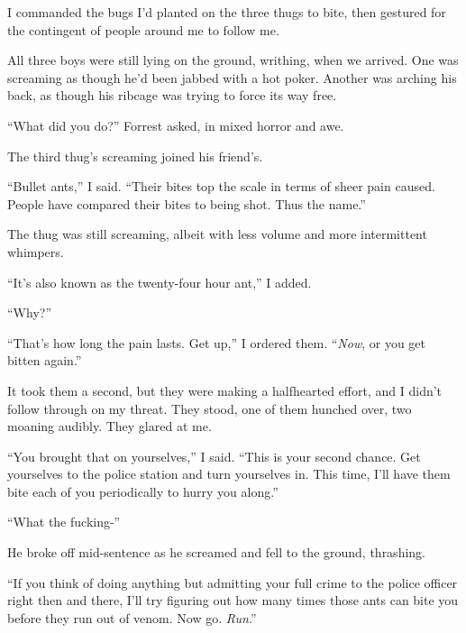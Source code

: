 I commanded the bugs I'd planted on the three thugs to bite, then gestured for the contingent of people around me to follow me.



All three boys were still lying on the ground, writhing, when we arrived.  One was screaming as though he'd been jabbed with a hot poker.  Another was arching his back, as though his ribcage was trying to force its way free.



``What did you do?''  Forrest asked, in mixed horror and awe.



The third thug's screaming joined his friend's.



``Bullet ants,'' I said.  ``Their bites top the scale in terms of sheer pain caused.  People have compared their bites to being shot.  Thus the name.''



The thug was still screaming, albeit with less volume and more intermittent whimpers.



``It's also known as the twenty-four hour ant,'' I added.



``Why?''



``That's how long the pain lasts.  Get up,'' I ordered them.  ``\emph{Now}, or you get bitten again.''



It took them a second, but they were making a halfhearted effort, and I didn't follow through on my threat.  They stood, one of them hunched over, two moaning audibly.  They glared at me.



``You brought that on yourselves,'' I said.  ``This is your second chance.  Get yourselves to the police station and turn yourselves in.  This time, I'll have them bite each of you periodically to hurry you along.''



``What the fucking-''



He broke off mid-sentence as he screamed and fell to the ground, thrashing.



``If you think of doing anything but admitting your full crime to the police officer right then and there, I'll try figuring out how many times those ants can bite you before they run out of venom.  Now go.  \emph{Run}.''



